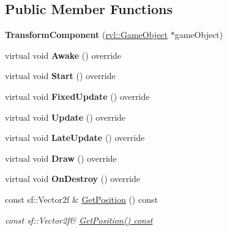\subsection*{Public Member Functions}
\begin{DoxyCompactItemize}
\item 
\mbox{\label{classrvl_1_1_transform_component_aa603de41dbcddb66be93e255e06c6ee9}} 
{\bfseries Transform\+Component} (\hyperlink{classrvl_1_1_game_object}{rvl\+::\+Game\+Object} $\ast$game\+Object)
\item 
\mbox{\label{classrvl_1_1_transform_component_a849f24d0a75ca09e36e546c1b9a65fae}} 
virtual void {\bfseries Awake} () override
\item 
\mbox{\label{classrvl_1_1_transform_component_ada6df767503b59a7e362f2e1c43252fd}} 
virtual void {\bfseries Start} () override
\item 
\mbox{\label{classrvl_1_1_transform_component_ab05f39253f9358ca27d93b6c4cf141e2}} 
virtual void {\bfseries Fixed\+Update} () override
\item 
\mbox{\label{classrvl_1_1_transform_component_a1e5af5e9e96b39142de444cc83c0a266}} 
virtual void {\bfseries Update} () override
\item 
\mbox{\label{classrvl_1_1_transform_component_ae6f730882509fc3af229efef5e68da1a}} 
virtual void {\bfseries Late\+Update} () override
\item 
\mbox{\label{classrvl_1_1_transform_component_aa3ee2fcc5987479b3b83c32b1b22be80}} 
virtual void {\bfseries Draw} () override
\item 
\mbox{\label{classrvl_1_1_transform_component_ae6aff96d47dc31de1ed0ff8c2d21511d}} 
virtual void {\bfseries On\+Destroy} () override
\item 
const sf\+::\+Vector2f \& \hyperlink{classrvl_1_1_transform_component_aafd23354a3e3b214569cdb6eedbf0dc1}{Get\+Position} () const
\begin{DoxyCompactList}\small\item\em const sf\+::\+Vector2f\& \hyperlink{classrvl_1_1_transform_component_aafd23354a3e3b214569cdb6eedbf0dc1}{Get\+Position() const} \end{DoxyCompactList}\item 

\end{DoxyCompactItemize}
